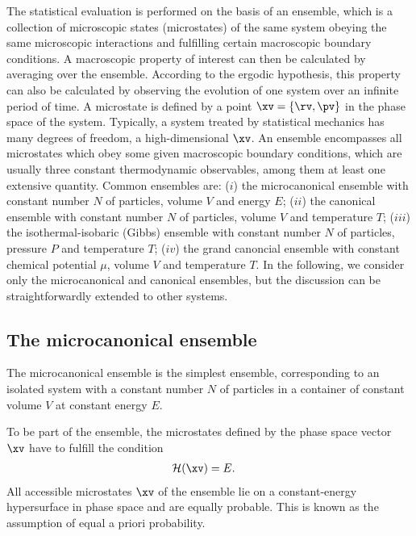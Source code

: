 %
The statistical evaluation is performed on the basis of an ensemble, which is a collection of microscopic states (microstates) of the same system obeying the same microscopic interactions and fulfilling certain macroscopic boundary conditions. A macroscopic property of interest can then be calculated by averaging over the ensemble.
%
%
According to the ergodic hypothesis,\cite{GA16.8} this property can also be calculated by observing the evolution
of one system over an infinite period of time. 
%
%
A microstate is defined by a point $\xv=\{\rv,\pv\}$ in the phase space of the system.
Typically, a system
treated by statistical mechanics has many degrees of freedom, \ie{} a high-dimensional $\xv$.
%
An ensemble encompasses all microstates which obey some given macroscopic boundary conditions,
which are usually three constant thermodynamic observables, among them at least
one extensive quantity.
Common ensembles are:
($i$) the
microcanonical ensemble with constant number $N$ of particles, volume $V$ and energy $E$;
($ii$)
the canonical ensemble with constant number $N$ of particles, volume $V$ and temperature $T$;
($iii$) the isothermal-isobaric (Gibbs) ensemble with constant number $N$ of particles, pressure $P$ and temperature $T$;
($iv$)
the grand canoncial ensemble with constant chemical potential $\mu$, volume $V$ and temperature $T$.
%
In the following, we consider only the microcanonical and canonical ensembles, but the discussion can be straightforwardly extended to other systems.
%

\subsection{The microcanonical ensemble}
%
The microcanonical ensemble is the simplest ensemble, corresponding to an isolated system
with a constant number $N$ of particles in a container of constant volume $V$ at constant energy $E$.

To be part of the ensemble, the microstates defined by the phase space vector $\xv$ have to fulfill the condition 
%
\begin{align}
\mathcal{H}(\xv) &= E.
\end{align}
%
All accessible microstates $\xv$ of the ensemble lie on a constant-energy hypersurface in phase space
and are equally probable. This is known as the assumption of equal a priori probability.
%

